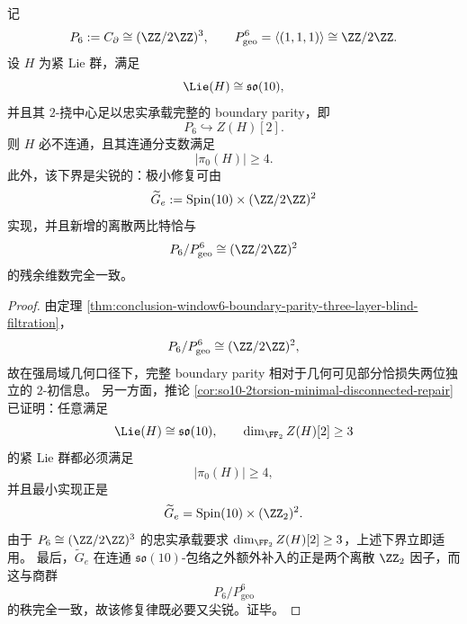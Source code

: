 \begin{theorem}\label{thm:conclusion-window6-boundary-parity-lie-repair-two-bits}
记
\[
P_6:=C_{\partial}\cong (\ZZ/2\ZZ)^3,
\qquad
P_{\mathrm{geo}}^6=\langle(1,1,1)\rangle\cong \ZZ/2\ZZ.
\]
设 \(H\) 为紧 Lie 群，满足
\[
\Lie(H)\cong \mathfrak{so}(10),
\]
并且其 \(2\)-挠中心足以忠实承载完整的 boundary parity，即
\[
P_6\hookrightarrow Z(H)[2].
\]
则 \(H\) 必不连通，且其连通分支数满足
\[
|\pi_0(H)|\ge 4.
\]
此外，该下界是尖锐的：极小修复可由
\[
\widetilde G_e:=\mathrm{Spin}(10)\times (\ZZ/2\ZZ)^2
\]
实现，并且新增的离散两比特恰与
\[
P_6/P_{\mathrm{geo}}^6\cong (\ZZ/2\ZZ)^2
\]
的残余维数完全一致。
\end{theorem}
\begin{proof}
由定理 \ref{thm:conclusion-window6-boundary-parity-three-layer-blind-filtration}，
\[
P_6/P_{\mathrm{geo}}^6\cong (\ZZ/2\ZZ)^2,
\]
故在强局域几何口径下，完整 boundary parity 相对于几何可见部分恰损失两位独立的 \(2\)-初信息。
另一方面，推论 \ref{cor:so10-2torsion-minimal-disconnected-repair} 已证明：任意满足
\[
\Lie(H)\cong \mathfrak{so}(10),
\qquad
\dim_{\FF_2}Z(H)[2]\ge 3
\]
的紧 Lie 群都必须满足
\[
|\pi_0(H)|\ge 4,
\]
并且最小实现正是
\[
\widetilde G_e=\mathrm{Spin}(10)\times (\ZZ_2)^2.
\]
由于 \(P_6\cong (\ZZ/2\ZZ)^3\) 的忠实承载要求 \(\dim_{\FF_2}Z(H)[2]\ge 3\)，上述下界立即适用。
最后，\(\widetilde G_e\) 在连通 \(\mathfrak{so}(10)\)-包络之外额外补入的正是两个离散 \(\ZZ_2\) 因子，而这与商群
\[
P_6/P_{\mathrm{geo}}^6
\]
的秩完全一致，故该修复律既必要又尖锐。证毕。
\end{proof}

